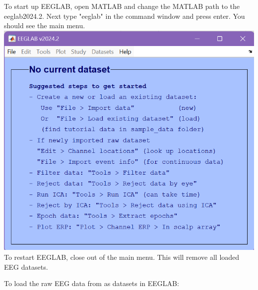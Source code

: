 \documentclass[12pt]{article}
\begin{document}
To start up EEGLAB, open MATLAB and change the MATLAB path to the eeglab2024.2. Next type "eeglab" in the command window and press enter. You should see the main menu.\newline
\includegraphics[scale=0.4]{EEGLABMainMenu}\newline
To restart EEGLAB, close out of the main menu. This will remove all loaded EEG datasets.

To load the raw EEG data from as datasets in EEGLAB:
\end{document}
